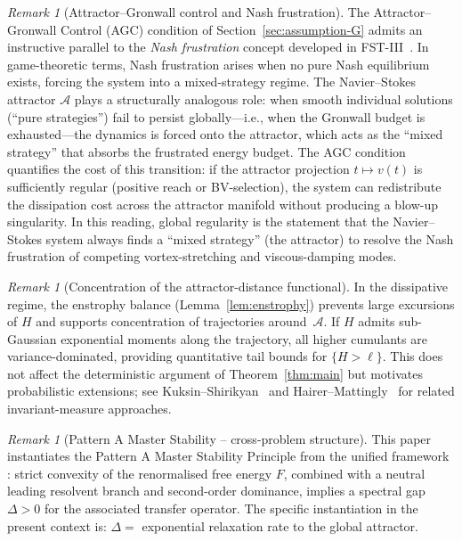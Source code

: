 \documentclass[12pt,a4paper]{article}
\theoremstyle{definition}
\theoremstyle{plain}
\theoremstyle{remark}
\newtheorem{remark}[definition]{Remark}
\begin{document}
\begin{remark}[Attractor--Gronwall control and Nash frustration]
\label{rem:agc-nash-frustration}
The Attractor--Gronwall Control (AGC) condition of
Section~\ref{sec:assumption-G} admits an instructive parallel
to the \emph{Nash frustration} concept developed in
FST-III~\cite{FST-Unified2026}.  In game-theoretic terms,
Nash frustration arises when no pure Nash equilibrium exists,
forcing the system into a mixed-strategy regime.
The Navier--Stokes attractor $\mathcal{A}$ plays a structurally
analogous role: when smooth individual solutions (``pure strategies'')
fail to persist globally---i.e., when the Gronwall budget is
exhausted---the dynamics is forced onto the attractor, which acts as
the ``mixed strategy'' that absorbs the frustrated energy budget.
The AGC condition quantifies the cost of this transition: if the
attractor projection $t \mapsto v(t)$ is sufficiently regular
(positive reach or BV-selection), the system can redistribute
the dissipation cost across the attractor manifold without
producing a blow-up singularity.  In this reading, global regularity
is the statement that the Navier--Stokes system always finds a
``mixed strategy'' (the attractor) to resolve the Nash frustration
of competing vortex-stretching and viscous-damping modes.
\end{remark}

\begin{remark}[Concentration of the attractor-distance functional]
\label{rem:cumulants}
In the dissipative regime, the enstrophy balance
(Lemma~\ref{lem:enstrophy}) prevents large excursions of $H$ and
supports concentration of trajectories around~$\mathcal{A}$.
If $H$ admits sub-Gaussian exponential moments along the trajectory,
all higher cumulants are variance-dominated, providing quantitative
tail bounds for $\{H > \ell\}$.  This does not affect the deterministic
argument of Theorem~\ref{thm:main} but motivates probabilistic
extensions; see
Kuksin--Shirikyan~\cite{KuksinShirikyan2012} and
Hairer--Mattingly~\cite{HairerMattingly2006} for related invariant-measure approaches.
\end{remark}

\begin{remark}[Pattern A Master Stability -- cross-problem structure]
This paper instantiates the Pattern A Master Stability Principle from the unified framework \cite{FST-Unified2026}: strict convexity of the renormalised free energy $F$, combined with a neutral leading resolvent branch and second-order dominance, implies a spectral gap $\Delta > 0$ for the associated transfer operator. The specific instantiation in the present context is: $\Delta = $ exponential relaxation rate to the global attractor.
\end{remark}
\end{document}
